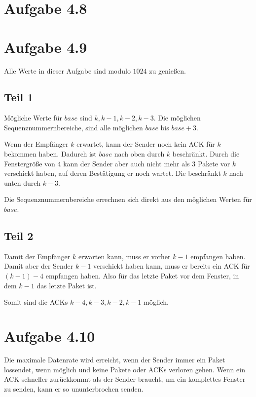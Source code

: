 \documentclass[10pt,a4paper]{article}
\begin{document}
\section{Aufgabe 4.8}

\section{Aufgabe 4.9}

Alle Werte in dieser Aufgabe sind modulo $1024$ zu genießen.

\subsection{Teil 1}

Mögliche Werte für $base$ sind $k, k - 1, k - 2, k - 3$. Die möglichen
Sequenznummernbereiche, sind alle möglichen $base$ bis $base + 3$.

Wenn der Empfänger $k$ erwartet, kann der Sender noch kein ACK für $k$ bekommen
haben. Dadurch ist $base$ nach oben durch $k$ beschränkt. Durch die Fenstergröße
von $4$ kann der Sender aber auch nicht mehr als $3$ Pakete vor $k$ verschickt
haben, auf deren Bestätigung er noch wartet. Die beschränkt $k$ nach unten durch
$k - 3$.

Die Sequenznummernbereiche errechnen sich direkt aus den möglichen Werten für
$base$.

\subsection{Teil 2}

Damit der Empfänger $k$ erwarten kann, muss er vorher $k - 1$ empfangen
haben. Damit aber der Sender $k - 1$ verschickt haben kann, muss er bereits ein
ACK für $(k - 1) - 4$ empfangen haben. Also für das letzte Paket vor dem
Fenster, in dem $k - 1$ das letzte Paket ist.

Somit sind die ACKs $k - 4, k - 3, k - 2, k - 1$ möglich.

\section{Aufgabe 4.10}

Die maximale Datenrate wird erreicht, wenn der Sender immer ein Paket lossendet,
wenn möglich und keine Pakete oder ACKs verloren gehen. Wenn ein ACK schneller
zurückkommt als der Sender braucht, um ein komplettes Fenster zu senden, kann er
so ununterbrochen senden.
\end{document}

